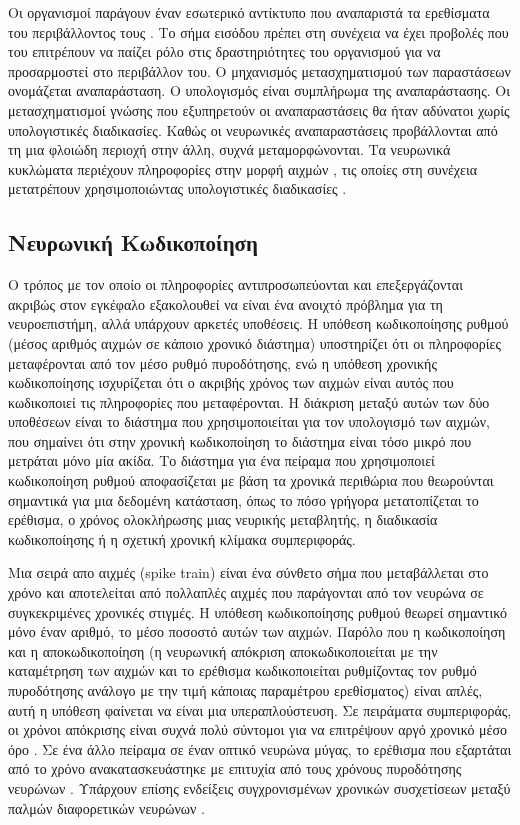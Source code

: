 \documentclass[12pt]{report}
\begin{document}
Οι οργανισμοί παράγουν έναν εσωτερικό αντίκτυπο που αναπαριστά τα ερεθίσματα του περιβάλλοντος τους \cite{Koch1994}. Το σήμα εισόδου πρέπει στη συνέχεια να έχει προβολές που του επιτρέπουν να παίζει ρόλο στις δραστηριότητες του οργανισμού για να προσαρμοστεί στο περιβάλλον του. Ο μηχανισμός μετασχηματισμού των παραστάσεων ονομάζεται αναπαράσταση. Ο υπολογισμός είναι συμπλήρωμα της αναπαράστασης. Οι μετασχηματισμοί γνώσης που εξυπηρετούν οι αναπαραστάσεις θα ήταν αδύνατοι χωρίς υπολογιστικές διαδικασίες. Καθώς οι νευρωνικές αναπαραστάσεις προβάλλονται από τη μια φλοιώδη περιοχή στην άλλη, συχνά μεταμορφώνονται. Τα νευρωνικά κυκλώματα περιέχουν πληροφορίες στην μορφή αιχμών , τις οποίες στη συνέχεια μετατρέπουν χρησιμοποιώντας υπολογιστικές διαδικασίες \cite{decharms2000}. 

\subsection{Nευρωνική Κωδικοποίηση}

Ο τρόπος με τον οποίο οι πληροφορίες αντιπροσωπεύονται και επεξεργάζονται  ακριβώς στον εγκέφαλο εξακολουθεί να είναι ένα ανοιχτό πρόβλημα για τη νευροεπιστήμη, αλλά υπάρχουν αρκετές υποθέσεις. Η υπόθεση κωδικοποίησης ρυθμού (μέσος αριθμός αιχμών σε κάποιο χρονικό διάστημα) \cite{Salzman1992} \cite{Tovee1993} υποστηρίζει ότι οι πληροφορίες μεταφέρονται από τον μέσο ρυθμό πυροδότησης, ενώ η υπόθεση χρονικής κωδικοποίησης \cite{Bair1996} \cite{buracas1998} \cite{Rucci2018} ισχυρίζεται ότι ο ακριβής χρόνος των αιχμών είναι αυτός που κωδικοποιεί τις πληροφορίες που μεταφέρονται.
Η διάκριση μεταξύ αυτών των δύο υποθέσεων είναι το διάστημα που χρησιμοποιείται για τον υπολογισμό των αιχμών, που σημαίνει ότι στην χρονική κωδικοποίηση το διάστημα είναι τόσο μικρό που μετράται μόνο μία ακίδα. Το διάστημα για ένα πείραμα που χρησιμοποιεί κωδικοποίηση ρυθμού αποφασίζεται με βάση τα χρονικά περιθώρια που θεωρούνται σημαντικά για μια δεδομένη κατάσταση, όπως το πόσο γρήγορα μετατοπίζεται το ερέθισμα, ο χρόνος ολοκλήρωσης μιας νευρικής μεταβλητής, η διαδικασία κωδικοποίησης ή η σχετική χρονική κλίμακα συμπεριφοράς.

Μια σειρά απο αιχμές (\textlatin{spike train}) είναι ένα σύνθετο σήμα που μεταβάλλεται στο χρόνο και αποτελείται από πολλαπλές αιχμές που παράγονται από τον νευρώνα σε συγκεκριμένες χρονικές στιγμές. Η υπόθεση κωδικοποίησης ρυθμού θεωρεί σημαντικό μόνο έναν αριθμό, το μέσο ποσοστό αυτών των αιχμών. Παρόλο που η κωδικοποίηση και η αποκωδικοποίηση (η νευρωνική απόκριση αποκωδικοποιείται με την καταμέτρηση των αιχμών και το ερέθισμα κωδικοποιείται ρυθμίζοντας τον ρυθμό πυροδότησης ανάλογο με την τιμή κάποιας παραμέτρου ερεθίσματος) είναι απλές, αυτή η υπόθεση φαίνεται να είναι μια υπεραπλούστευση. Σε πειράματα συμπεριφοράς, οι χρόνοι απόκρισης είναι συχνά πολύ σύντομοι για να επιτρέψουν αργό χρονικό μέσο όρο \cite{thorpe1996}. Σε ένα άλλο πείραμα σε έναν οπτικό νευρώνα μύγας, το ερέθισμα που εξαρτάται από το χρόνο ανακατασκευάστηκε με επιτυχία από τους χρόνους πυροδότησης νευρώνων \cite{Bialek1991}. Υπάρχουν επίσης ενδείξεις συγχρονισμένων χρονικών συσχετίσεων μεταξύ παλμών διαφορετικών νευρώνων \cite{Lestienne1996}. 
\end{document}
